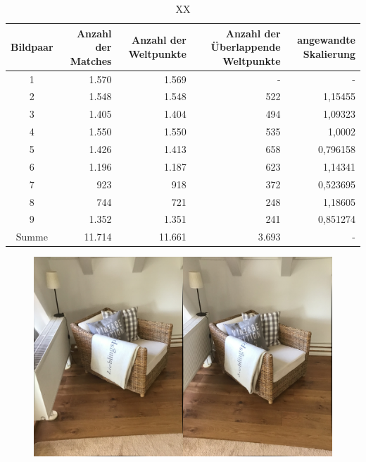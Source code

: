 \begin{table}
    \begin{tabularx}{\textwidth}{c r r r r}
        \toprule
        Bildpaar &  Anzahl der Matches & Anzahl der Weltpunkte & Anzahl der Überlappende Weltpunkte & angewandte Skalierung \\ 
        \midrule
        1 & 1.570 & 1.569 & -  & - \\
        2 & 1.548 & 1.548 & 522 & 1,15455 \\
        3 & 1.405 & 1.404 & 494 & 1,09323 \\
        4 & 1.550 & 1.550 & 535 & 1,0002 \\
        5 & 1.426 & 1.413 & 658 & 0,796158 \\
        6 & 1.196 & 1.187 & 623 & 1,14341 \\
        7 & 923 & 918 & 372 & 0,523695 \\
        8 & 744 & 721 & 248 & 1,18605 \\
        9 & 1.352 & 1.351 & 241 & 0,851274 \\
        \midrule
        Summe & 11.714 & 11.661 & 3.693 & - \\
        \bottomrule
    \end{tabularx}
    \caption{XX}
    \label{tab:chair-results}
\end{table}

\begin{figure}
    \includegraphics[width=\textwidth]{src/img/chair_first_pair.jpg}
    \caption{}
    \label{fig:chair-first-pair}
\end{figure}

